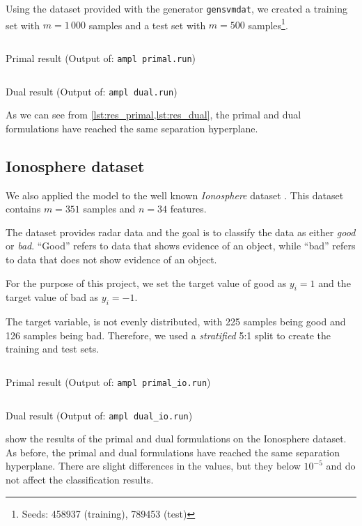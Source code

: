 Using the dataset provided with the generator \texttt{gensvmdat},
we created a training set with $m=1\,000$ samples and a test set
with $m=500$ samples\footnote{Seeds: 458937 (training), 789453 (test)}.


\begin{listing}[H]
\inputminted[firstline=1,bgcolor=lightcodeBg]{text}{../outputs/primal.out}
\caption{Primal result (Output of: \texttt{ampl primal.run})}
\label{lst:res_primal}
\end{listing}

\begin{listing}[H]
\inputminted[firstline=1,bgcolor=lightcodeBg]{text}{../outputs/dual.out}
\caption{Dual result (Output of: \texttt{ampl dual.run})}
\label{lst:res_dual}
\end{listing}

As we can see from \cref{lst:res_primal,lst:res_dual},
the primal and dual formulations have
reached the same separation hyperplane.

\subsection{Ionosphere dataset}
We also applied the model to the well known \emph{Ionosphere} dataset%
\cite{noauthor_uci_nodate}. This dataset contains $m=351$ samples
and $n=34$ features. 

The dataset provides radar data and the goal is to classify
the data as either \emph{good} or \emph{bad}. ``Good'' refers to
data that shows evidence of an object, while ``bad'' refers to
data that does not show evidence of an object.

For the purpose of this project, we set the target value of good
as $y_i = 1$ and the target value of bad as $y_i = -1$.

The target variable, is not evenly distributed, with 225 samples
being good and 126 samples being bad. Therefore, we used a
\emph{stratified} 5:1 split to create the training and test sets.

\begin{listing}[H]
\inputminted[firstline=1,bgcolor=lightcodeBg]{text}{../outputs/primal_io.out}
\caption{Primal result (Output of: \texttt{ampl primal\_io.run})}
\label{lst:res_primal_io}
\end{listing}

\begin{listing}[H]
\inputminted[firstline=1,bgcolor=lightcodeBg]{text}{../outputs/dual_io.out}
\caption{Dual result (Output of: \texttt{ampl dual\_io.run})}
\label{lst:res_dual_io}
\end{listing}

 show the results of the
primal and dual formulations on the Ionosphere dataset. As before,
the primal and dual formulations have reached the same separation
hyperplane. There are slight differences in the values, but they
below $10^{-5}$ and do not affect the classification results.

